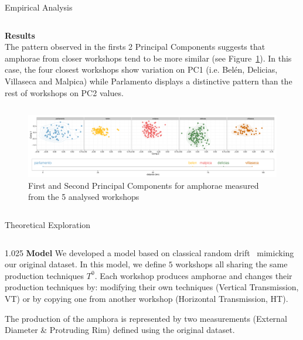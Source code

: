 \documentclass[final]{beamer}
\newlength{\onecolwid}
\newlength{\twocolwid}
\begin{document}
\begin{frame}[t]
\begin{columns}[t]
\begin{column}{\twocolwid}
\begin{block}{Empirical Analysis}
\begin{columns}[t,totalwidth=\twocolwid]
\begin{column}{\onecolwid} %

{\textbf{Results}}\\
\justify
The pattern observed in the firsts 2 Principal Components suggests that amphorae from closer workshops tend to be more similar (see Figure~\ref{fig:pca}). In this case, the four closest workshops show variation on PC1 (i.e. Bel\'en, Delicias, Villaseca and Malpica) while Parlamento displays a distinctive pattern than the rest of workshops on PC2 values.


\end{column}
\end{columns}

\begin{columns}[t,totalwidth=\twocolwid]


\begin{column}{\twocolwid} %
\begin{figure}
\includegraphics[width=0.6\linewidth]{images/fig2.pdf}
\singlespace
\caption{First and Second Principal Components for amphorae measured from the 5 analysed workshops}
\label{fig:pca}
\end{figure}
\end{column}
\end{columns}
\end{block}
\vspace{-1cm}
\begin{block}{Theoretical Exploration}

\begin{columns}[t,totalwidth=\twocolwid]

\begin{column}{1.025\onecolwid} %
{\textbf{Model }}
\justify
We developed a model based on classical random drift~\cite{bentley2004randomdriftandculturechange} mimicking our original dataset. In this model, we define $5$ workshops all sharing the same production techniques $T^{0}$. 
Each workshop produces amphorae and changes their production techniques by: modifying their own techniques (Vertical Transmission, VT) or by copying one from another workshop (Horizontal Transmission, HT). 

The production of the amphora is represented by two measurements (External Diameter \& Protruding Rim) defined using the original dataset.



\end{column}
\end{columns}
\end{block}
\end{column}
\end{columns}
\end{frame}
\end{document}
